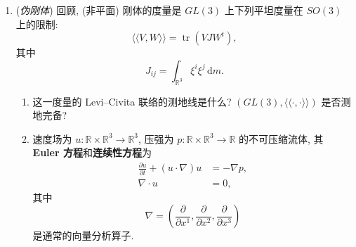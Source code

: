 \begin{RiemannExercise}
\begin{enumerate}[label=(\arabic*),ref=\arabic*,leftmargin=*]
\[\]
[参见 Exercise~\ref{ex:rigid-body}(\ref{ex:chandler-precession})]. 因此, 月球和太阳的共同引力会扰动地球的自转运动. 该扰动可用势能 $U:SO(3)\to\mathbb{R}$ 近似模拟. 在 Euler 角 $(\theta,\varphi,\psi)$ 下, 势能为
\[
  U=-\frac{\Omega^2}{2}(I_3-I_1)\cos^2\theta,
\]
其中 $\frac{2\pi}{\Omega}\simeq168$ 天.
\begin{enumerate}[label=(\alph*),leftmargin=*]
\item 写出运动方程并确定平衡点.
\item 证明存在 $\theta$, $\dot\varphi$ 和 $\dot\psi$ 为常量的解, 在 $|\dot\varphi|\ll|\dot\psi|$ 的极限下 (地球即属此情形) 满足
\[
  \dot\varphi\simeq-\frac{\Omega^2(I_3-I_1)\cos\theta}{I_3\dot\psi}.
\]
已知对地球有 $\theta\simeq23^\circ$, 求 $\varphi(t)$ 周期的近似值.
\end{enumerate}
\item\label{ex:pseudo-rigid-body} (\emph{伪刚体}) 回顾, (非平面) 刚体的度量是 $GL(3)$ 上下列平坦度量在 $SO(3)$ 上的限制:
\[
  \langle\!\langle V,W\rangle\!\rangle=\operatorname{tr}(VJW^t),
\]
其中
\[
  J_{ij}=\int_{\mathbb{R}^3}\xi^i\xi^j\,\mathrm{d}m.
\]
\begin{enumerate}[label=(\alph*),leftmargin=*]
\item 这一度量的 Levi–Civita 联络的测地线是什么? $(GL(3),\langle\!\langle\cdot,\cdot\rangle\!\rangle)$ 是否测地完备?
\item 速度场为 $u:\mathbb{R}\times\mathbb{R}^3\to\mathbb{R}^3$, 压强为 $p:\mathbb{R}\times\mathbb{R}^3\to\mathbb{R}$ 的不可压缩流体, 其 \textbf{Euler 方程}和\textbf{连续性方程}为
\[
  \begin{aligned}
    \frac{\partial u}{\partial t}+(u\cdot\nabla)u&=-\nabla p,\\
    \nabla\cdot u&=0,
  \end{aligned}
\]
其中
\[
  \nabla=\left(\frac{\partial}{\partial x^1},\frac{\partial}{\partial x^2},\frac{\partial}{\partial x^3}\right)
\]
是通常的向量分析算子.


\end{enumerate}
\end{enumerate}
\end{RiemannExercise}
